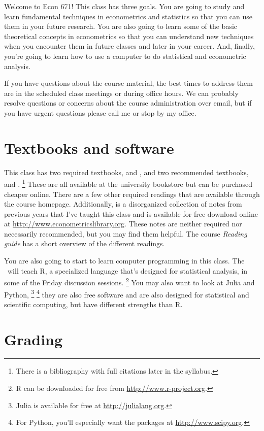 \noindent%
Welcome to Econ 671! This class has three goals. You are going to
study and learn fundamental techniques in econometrics and statistics
so that you can use them in your future research.  You are also going
to learn some of the basic theoretical concepts in econometrics so
that you can understand new techniques when you encounter them in
future classes and later in your career.  And, finally, you're going
to learn how to use a computer to do statistical and econometric
analysis.

If you have questions about the course material, the best times to
address them are in the scheduled class meetings or during office
hours. We can probably resolve questions or concerns about the course
administration over email, but if you have urgent questions please
call me or stop by my office.

\section{Textbooks and software}

This class has two required textbooks, \citep{CB02} and \citep{Gr12},
and two recommended textbooks, \citep{Ga97} and \citep{Fr09}.%
\footnote{There is a bibliography with full citations later in the
  syllabus.} %
These are all available at the university bookstore but can be
purchased cheaper online. There are a few other required readings that
are available through the course homepage. Additionally,
\citep{eflp-core} is a disorganized collection of notes from previous
years that I've taught this class and is available for free download
online at \url{http://www.econometricslibrary.org}. These notes are
neither required nor necessarily recommended, but you may find them
helpful.  The course \emph{Reading guide} has a short overview of the
different readings.

You are also going to start to learn computer programming in this
class. The \TA\ will teach R, a specialized language that's designed
for statistical analysis, in some of the Friday discussion sessions.%
\footnote{R can be downloaded for free from
  \url{http://www.r-project.org}.} %
You may also want to look at Julia and Python,%
\footnote{Julia is available for free at \url{http://julialang.org}.}%
\footnote{For Python, you'll especially want the packages at
  \url{http://www.scipy.org}.} %
they are also free software and are also designed for statistical and
scientific computing, but have different strengths than R.

\section{Grading}

